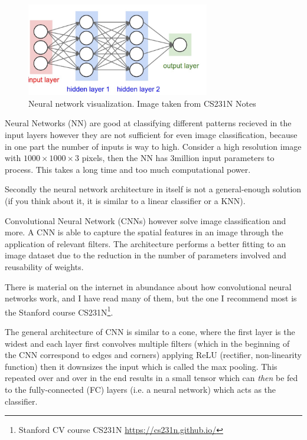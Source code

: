 \begin{figure}[!ht]
    \centering
    \includegraphics[width=80mm, keepaspectratio]{figures/nn.png}
    \caption{Neural network visualization. Image taken from CS231N Notes}
    \label{fig:convnet}
\end{figure}

Neural Networks (NN) are good at classifying different patterns recieved in the
input layers however they are not sufficient for even image classification,
because in one part the number of inputs is way to high. Consider a high
resolution image with $1000\times 1000\times 3$ pixels, then the NN has 3million input
parameters to process. This takes a long time and too much computational power.

Secondly the neural network architecture in itself is not a
general-enough solution (if you think about it, it is similar to a linear
classifier or a KNN).

Convolutional Neural Network (CNNs) however solve image classification and more.
A CNN is able to capture the spatial features in an image through the
application of relevant filters. The architecture performs a better fitting to
an image dataset due to the reduction in the number of parameters involved and
reusability of weights.


There is material on the internet in abundance about how convolutional neural
networks work, and I have read many of them, but the one I recommend most is the
Stanford course CS231N\footnote{ Stanford CV course CS231N
    \url{https://cs231n.github.io/}}. 

The general architecture of CNN is similar to a cone, where the first layer is
the widest and each layer first convolves multiple filters (which in the
beginning of the CNN correspond to edges and corners) applying ReLU (rectifier,
non-linearity function) then it downsizes the input which is called the max
pooling. This repeated over and over in the end results in a small tensor
which can \emph{then} be fed to the fully-connected (FC) layers (i.e. a neural network)
which acts as the classifier.

